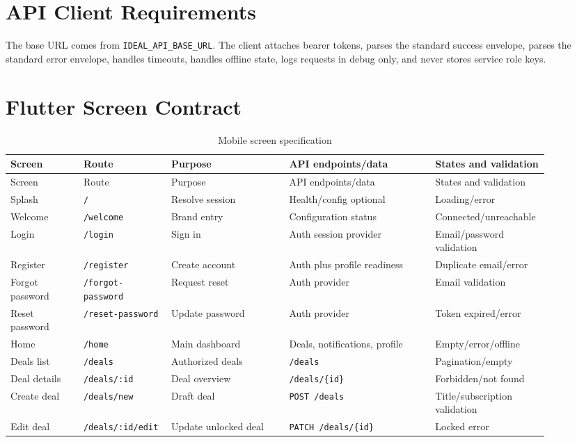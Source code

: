 \section*{API Client Requirements}
The base URL comes from \texttt{IDEAL\_API\_BASE\_URL}. The client attaches bearer tokens, parses the standard success envelope, parses the standard error envelope, handles timeouts, handles offline state, logs requests in debug only, and never stores service role keys.

\section*{Flutter Screen Contract}
\begin{longtable}{p{0.13\linewidth}p{0.14\linewidth}p{0.21\linewidth}p{0.26\linewidth}p{0.16\linewidth}}
\caption{Mobile screen specification}\\
\toprule
Screen & Route & Purpose & API endpoints/data & States and validation \\
\midrule
\endfirsthead
\toprule
Screen & Route & Purpose & API endpoints/data & States and validation \\
\midrule
\endhead
Splash & \texttt{/} & Resolve session & Health/config optional & Loading/error \\
Welcome & \texttt{/welcome} & Brand entry & Configuration status & Connected/unreachable \\
Login & \texttt{/login} & Sign in & Auth session provider & Email/password validation \\
Register & \texttt{/register} & Create account & Auth plus profile readiness & Duplicate email/error \\
Forgot password & \texttt{/forgot-password} & Request reset & Auth provider & Email validation \\
Reset password & \texttt{/reset-password} & Update password & Auth provider & Token expired/error \\
Home & \texttt{/home} & Main dashboard & Deals, notifications, profile & Empty/error/offline \\
Deals list & \texttt{/deals} & Authorized deals & \texttt{/deals} & Pagination/empty \\
Deal details & \texttt{/deals/:id} & Deal overview & \texttt{/deals/\{id\}} & Forbidden/not found \\
Create deal & \texttt{/deals/new} & Draft deal & \texttt{POST /deals} & Title/subscription validation \\
Edit deal & \texttt{/deals/:id/edit} & Update unlocked deal & \texttt{PATCH /deals/\{id\}} & Locked error \\

\end{longtable}
